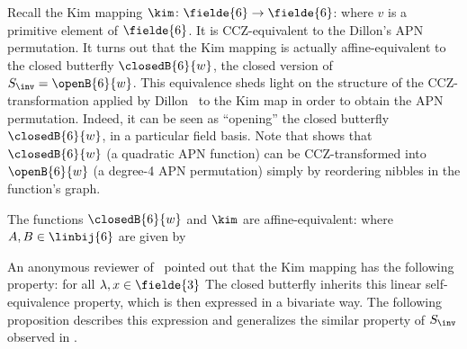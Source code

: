 
Recall the Kim mapping $\kim\colon \fielde{6} \to \fielde{6}$:
where $v$ is a primitive element of $\fielde{6}$. It is CCZ-equivalent to the Dillon's APN permutation. It turns out that the Kim mapping is actually affine-equivalent to the closed butterfly $\closedB{6}{w}$, the closed version of $S_{\inv} = \openB{6}{w}$. This equivalence sheds light on the structure of the CCZ-transformation applied by Dillon~\etal{} to the Kim map in order to obtain the APN permutation. Indeed, it can be seen as ``opening'' the closed butterfly $\closedB{6}{w}$, in a particular field basis. Note that  shows that $\closedB{6}{w}$ (a quadratic APN function) can be CCZ-transformed into $\openB{6}{w}$ (a degree-4 APN permutation) simply by reordering nibbles in the function's graph.

\begin{observation}
The functions $\closedB{6}{w}$ and $\kim$ are affine-equivalent:
where $A,B \in \linbij{6}$ are given by
\end{observation}

An anonymous reviewer of~\cite{OurAPN} pointed out that the Kim mapping has the following property: for all $\lambda,x \in \fielde{3}$
The closed butterfly inherits this linear self-equivalence property, which is then expressed in a bivariate way. The following proposition describes this expression and generalizes the similar property of $S_{\inv}$ observed in .

